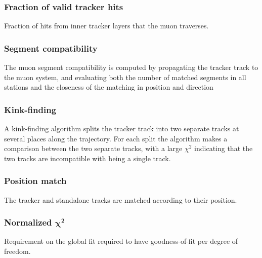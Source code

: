 \subsubsection*{Fraction of valid tracker hits}
\noindent\justify
 Fraction of hits from inner tracker layers that the muon traverses.  
\subsubsection*{Segment compatibility}
\noindent\justify
 The muon segment compatibility is computed by propagating the tracker track to the muon system, and evaluating both the number of matched segments in all stations and the closeness of the matching in position and direction     
\subsubsection*{Kink-finding}
\noindent\justify
A kink-finding algorithm splits the tracker track into two separate tracks at several places along the trajectory.
For each split the algorithm makes a comparison between the two separate tracks, with a large $\chi^{2}$ indicating that the two tracks are incompatible with being a single track.
\subsubsection*{Position match} 
\noindent\justify
The tracker and standalone tracks are matched according to their position. 
\subsubsection*{Normalized $\bm{\chi^{2}}$}
\noindent\justify
Requirement on the global fit required to have goodness-of-fit per degree of freedom. 

